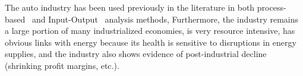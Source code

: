 The auto industry 
has been used previously
in the literature in both 
process-based~\cite{Berry:1973vo, Sullivan1995, Stodolsky1995, 
							Sullivan1998, McCleese2002, Sullivan2010, Hawkins2012}
and Input-Output~\cite{Bullard:1978vd, MacLean1998, MacLean2003}
analysis methods,
Furthermore, the industry
remains a large portion of many industrialized economies, 
is very resource intensive, 
has obvious links with energy because
its health is sensitive to disruptions in energy supplies, and
the industry also shows evidence of 
post-industrial decline (shrinking profit margins, etc.).







%
%


